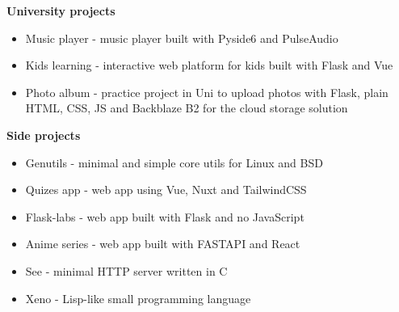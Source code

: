 {
    {\vspace{0.5cm} \hspace{-0.5cm} \Large \textbf{University projects}}
    \begin{itemize}
        \item {Music player - music player built with Pyside6 and PulseAudio}
        \item {Kids learning - interactive web platform for kids built with Flask and Vue}
        \item {
            Photo album - practice project in Uni to upload photos with Flask, 
            plain HTML, CSS, JS and Backblaze B2 for the cloud storage solution
        }
    \end{itemize}

    {\vspace{0.5cm} \hspace{-1cm} \Large \textbf{Side projects}}

    \begin{itemize}
        \item {Genutils - minimal and simple core utils for Linux and BSD}
        \item {Quizes app - web app using Vue, Nuxt and TailwindCSS}
        \item {Flask-labs - web app built with Flask and no JavaScript}
        \item {Anime series - web app built with FASTAPI and React}
        \item {See - minimal HTTP server written in C}
        \item {Xeno - Lisp-like small programming language}
    \end{itemize}
}
